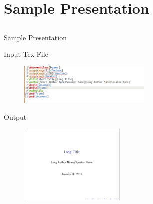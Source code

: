 \documentclass[[newPxFont]{beamer}
\begin{document}
\section[Sample]{Sample Presentation}
\subsection{}
\begin{frame}{Sample Presentation}
\begin{block}{Input Tex File}
    \begin{figure}[ht]
    \centering
    \includegraphics[width=2.5in]{figs/basic.png}
      \end{figure}
  \end{block}
\begin{block}{Output}
  \begin{figure}[ht]
    \centering
    \includegraphics[width=2in]{figs/basic_output.png} 
  \end{figure}
    \end{block}
   \end{frame} 
\end{document}
